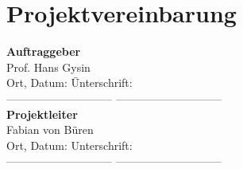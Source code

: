 \clearpage
\section{Projektvereinbarung}\label{sec:Projektvereinbarung}
	\begin{tabbing}
		\textbf{Auftraggeber}\\[0.2cm]
		Prof. Hans Gysin\\[0.2cm]
		Ort, Datum: \hspace{5cm}\=Unterschrift:
		\\[0.5cm]----------------------------- \>-----------------------------
		\\[0.5cm]
		\textbf{Projektleiter}\\[0.2cm]
		Fabian von Büren\\[0.2cm]
		Ort, Datum: \>Unterschrift:
		\\[0.5cm]----------------------------- \>-----------------------------
	\end{tabbing}
	
	\clearpage



